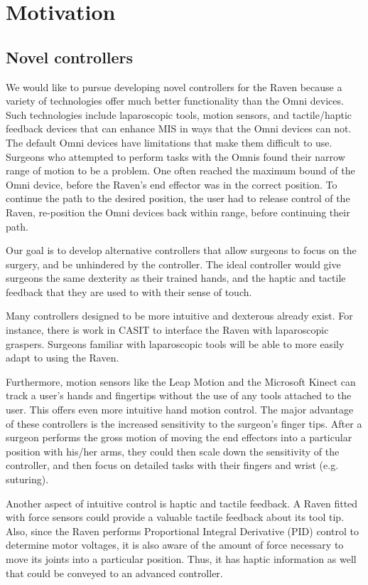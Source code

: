 \documentclass[letterpaper,twocolumn,10pt]{article}
\begin{document}
\section{Motivation}

\subsection{Novel controllers}
We would like to pursue developing novel controllers for the Raven
because a variety of technologies offer much better functionality than
the Omni devices. Such technologies include laparoscopic tools, motion
sensors, and tactile/haptic feedback devices that can enhance MIS in
ways that the Omni devices can not.  The default Omni devices have
limitations that make them difficult to use. Surgeons who attempted to
perform tasks with the Omnis found their narrow range of motion to be
a problem. One often reached the maximum bound of the Omni device,
before the Raven's end effector was in the correct position. To
continue the path to the desired position, the user had to release
control of the Raven, re-position the Omni devices back within range,
before continuing their path.

Our goal is to develop alternative controllers that allow surgeons to
focus on the surgery, and be unhindered by the controller. The ideal
controller would give surgeons the same dexterity as their trained
hands, and the haptic and tactile feedback that they are used to with
their sense of touch.

Many controllers designed to be more intuitive and dexterous already
exist. For instance, there is work in CASIT to interface the Raven
with laparoscopic graspers. Surgeons familiar with laparoscopic tools
will be able to more easily adapt to using the Raven.

Furthermore, motion sensors like the Leap Motion and the Microsoft
Kinect can track a user's hands and fingertips without the use of any
tools attached to the user. This offers even more intuitive hand
motion control. The major advantage of these controllers is the
increased sensitivity to the surgeon's finger tips. After a surgeon
performs the gross motion of moving the end effectors into a
particular position with his/her arms, they could then scale down the
sensitivity of the controller, and then focus on detailed tasks with
their fingers and wrist (e.g. suturing).

Another aspect of intuitive control is haptic and tactile feedback. A
Raven fitted with force sensors could provide a valuable tactile
feedback about its tool tip. Also, since the Raven performs
Proportional Integral Derivative (PID) control to determine motor
voltages, it is also aware of the amount of force necessary to move
its joints into a particular position. Thus, it has haptic information
as well that could be conveyed to an advanced controller.
\end{document}
